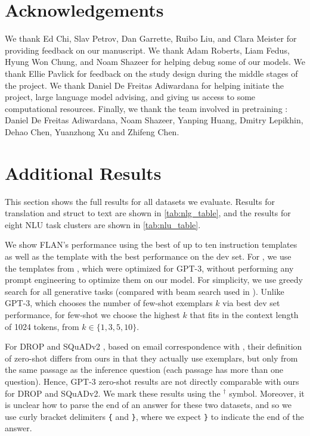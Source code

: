\section*{Acknowledgements}
We thank Ed Chi, Slav Petrov, Dan Garrette, Ruibo Liu, and Clara Meister for providing feedback on our manuscript. 
We thank Adam Roberts, Liam Fedus, Hyung Won Chung, and Noam Shazeer for helping debug some of our models. 
We thank Ellie Pavlick for feedback on the study design during the middle stages of the project.  
We thank Daniel De Freitas Adiwardana for helping initiate the project, large language model advising, and giving us access to some computational resources.
Finally, we thank the team involved in pretraining \baselm{}: Daniel De Freitas Adiwardana, Noam Shazeer, Yanping Huang, Dmitry Lepikhin, Dehao Chen, Yuanzhong Xu and Zhifeng Chen.

\clearpage 

\newpage 
\appendix

\newcommand{\trainsize}[0]{30,000}
\newcommand{\devsize}[0]{200}

\section{Additional Results}\label{sec:supp_all_results}

This section shows the full results for all datasets we evaluate.
Results for translation and struct to text are shown in \cref{tab:nlg_table}, and the results for eight NLU task clusters are shown in \cref{tab:nlu_table}.

We show FLAN's performance using the best of up to ten instruction templates as well as the template with the best performance on the dev set. 
For \baselm{}, we use the templates from \citet{brown2020language}, which were optimized for GPT-3, without performing any prompt engineering to optimize them on our model. 
For simplicity, we use greedy search for all generative tasks (compared with beam search used in \citet{brown2020language}). 
Unlike GPT-3, which chooses the number of few-shot exemplars $k$ via best dev set performance, for few-shot \baselm{} we choose the highest $k$ that fits in the context length of 1024 tokens, from $k \in \{1, 3, 5, 10\}$. 

For DROP \citep{Dua2019DROP} and SQuADv2 \citep{rajpurkar-etal-2018-know}, based on email correspondence with \citet{brown2020language}, their definition of zero-shot differs from ours in that they actually use exemplars, but only from the same passage as the inference question (each passage has more than one question). 
Hence, GPT-3 zero-shot results are not directly comparable with ours for DROP and SQuADv2.
We mark these results using the $^{\dagger}$ symbol.
Moreover, it is unclear how to parse the end of an answer for these two datasets, and so we use curly bracket delimiters \texttt{\{} and \texttt{\}}, where we expect \texttt{\}} to indicate the end of the answer.

